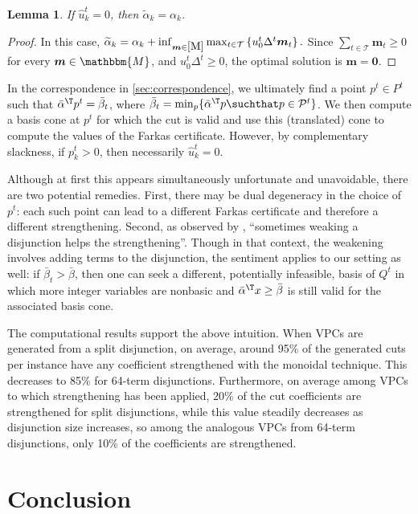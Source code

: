 \documentclass[oribibl,envcountsame]{llncs}
\newtheorem{lemma}[theorem]{Lemma}
\theoremstyle{remark}
\theoremstyle{definition}
\renewcommand{\vec}[1]{\boldsymbol{#1}}
\newcommand{\pointset}{\mathcal{P}}
\newcommand{\disjTermsIndexSet}{\mathcal{T}}
\newcommand{\M}{\ref{M}}
\newcommand{\Deltat}{\Delta^t}
\newcommand{\monoidSet}{\mathbbm{M}}
\newcommand{\monoid}{\vec{m}}
\begin{document}
\begin{lemma}
    If $\hat{u}^t_k = 0$, then $\widetilde{\alpha}_k = \alpha_k$.
\end{lemma}
\begin{proof}
    In this case,
    \(
        \widetilde{\alpha}_k 
            = \alpha_k + \inf_{\monoid \in \M} \max_{t \in \disjTermsIndexSet} \left\{ u^t_0 \Deltat \monoid_t \right\}.
    \)
    Since $\sum_{t \in \disjTermsIndexSet} \monoid_t \ge 0$ for every $\monoid \in \monoidSet$,
    and $u^t_0 \Deltat \ge 0$, the optimal solution is $\monoid = \vec{0}$.
\end{proof}

In the correspondence in \cref{sec:correspondence}, we ultimately find a point $p^t \in P^t$ such that $\bar{\alpha}^\T p^t = \bar{\beta}_t$,
where $\bar{\beta}_t = \min_p \{ \bar{\alpha}^\T p \suchthat p \in \pointset^t \}$.
We then compute a basis cone at $p^t$ for which the cut is valid and use this (translated) cone to compute the values of the Farkas certificate.
However, by complementary slackness, if $p^t_k > 0$, then necessarily $\hat{u}^t_k = 0$.

Although at first this appears simultaneously unfortunate and unavoidable,
there are two potential remedies.
First, there may be dual degeneracy in the choice of $p^t$: each such point can lead to a different Farkas certificate and therefore a different strengthening.
Second, as observed by \citet{BalQua12}, ``sometimes weaking a disjunction helps the strengthening''.
Though in that context, the weakening involves adding terms to the disjunction, the sentiment applies to our setting as well:
if $\bar{\beta}_t > \bar{\beta}$, then one can seek a different, potentially infeasible, basis of $Q^t$ in which more integer variables are nonbasic and $\bar{\alpha}^\T x \ge \bar{\beta}$ is still valid for the associated basis cone.

The computational results support the above intuition. %
When VPCs are generated from a split disjunction, on average, around 95\% of the generated cuts per instance have any coefficient strengthened with the monoidal technique.
This decreases to 85\% for 64-term disjunctions.
Furthermore, on average among VPCs to which strengthening has been applied, 20\% of the cut coefficients are strengthened for split disjunctions, while this value steadily decreases as disjunction size increases,
so among the analogous VPCs from 64-term disjunctions, only 10\% of the coefficients are strengthened.

    
\section{Conclusion}
\label{sec:conclusion}
\end{document}
